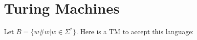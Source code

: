 




\section*{Turing Machines}

Let $B=\{w\#w | w\in\Sigma^*\}$.  Here is a TM to accept this language:



